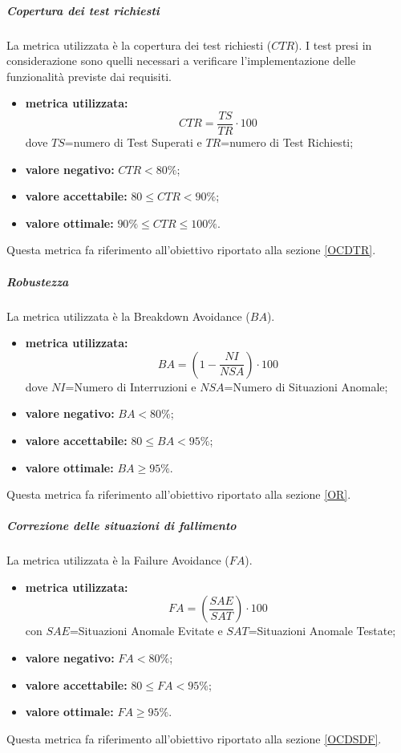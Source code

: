 				\subparagraph{Copertura dei test richiesti}
				\label{MCDTR}
				La metrica utilizzata è la copertura dei test richiesti ($CTR$). I test presi in considerazione sono quelli necessari a verificare l'implementazione delle funzionalità previste dai requisiti.
				\begin{itemize}
					\item \textbf{metrica utilizzata:} $$CTR=\frac{TS}{TR}\cdot100$$
					dove $TS$=numero di Test Superati e $TR$=numero di Test Richiesti;
					\item \textbf{valore negativo:} $CTR<80\%$;
					\item \textbf{valore accettabile:} $80\leq CTR<90\%$;
					\item \textbf{valore ottimale:} $90\% \leq CTR \leq 100\%$.
				\end{itemize}
				Questa metrica fa riferimento all'obiettivo riportato alla sezione \ref{OCDTR}.
			
				\subparagraph{Robustezza}
				\label{MR}
				La metrica utilizzata è la Breakdown Avoidance ($BA$). 
				\begin{itemize}
					\item \textbf{metrica utilizzata:} $$BA=\left( 1-\frac{NI}{NSA} \right)\cdot 100$$ 
					dove $NI$=Numero di Interruzioni e $NSA$=Numero di Situazioni Anomale;
					\item \textbf{valore negativo:} $BA< 80\%$;
					\item \textbf{valore accettabile:} $80 \leq BA<95\%$;
					\item \textbf{valore ottimale:} $BA\geq 95\%$.
				\end{itemize}
				Questa metrica fa riferimento all'obiettivo riportato alla sezione \ref{OR}.
				
				\subparagraph{Correzione delle situazioni di fallimento}
				\label{MCDSDF}
				La metrica utilizzata è la Failure Avoidance ($FA$). 
				\begin{itemize}
					\item \textbf{metrica utilizzata:} $$FA=\left(\frac{SAE}{SAT}\right) \cdot 100$$
					con $SAE$=Situazioni Anomale Evitate e $SAT$=Situazioni Anomale Testate;
					\item \textbf{valore negativo:} $FA< 80\%$;
					\item \textbf{valore accettabile:} $80\leq FA<95\%$;
					\item \textbf{valore ottimale:} $FA\geq 95\%$.
				\end{itemize}
				Questa metrica fa riferimento all'obiettivo riportato alla sezione \ref{OCDSDF}.
			
